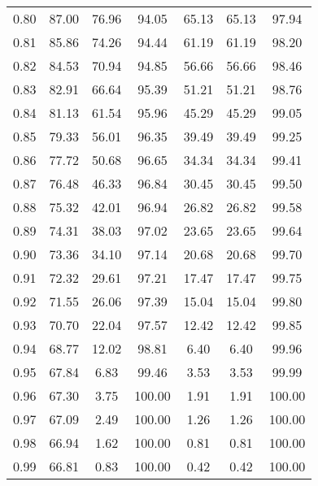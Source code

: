\begin{tabular}{|c|c|c|c|c|c|c|}
      0.80 &     87.00 &     76.96 &      94.05 &   65.13 &      65.13 &         97.94 \\
      0.81 &     85.86 &     74.26 &      94.44 &   61.19 &      61.19 &         98.20 \\
      0.82 &     84.53 &     70.94 &      94.85 &   56.66 &      56.66 &         98.46 \\
      0.83 &     82.91 &     66.64 &      95.39 &   51.21 &      51.21 &         98.76 \\
      0.84 &     81.13 &     61.54 &      95.96 &   45.29 &      45.29 &         99.05 \\
      0.85 &     79.33 &     56.01 &      96.35 &   39.49 &      39.49 &         99.25 \\
      0.86 &     77.72 &     50.68 &      96.65 &   34.34 &      34.34 &         99.41 \\
      0.87 &     76.48 &     46.33 &      96.84 &   30.45 &      30.45 &         99.50 \\
      0.88 &     75.32 &     42.01 &      96.94 &   26.82 &      26.82 &         99.58 \\
      0.89 &     74.31 &     38.03 &      97.02 &   23.65 &      23.65 &         99.64 \\
      0.90 &     73.36 &     34.10 &      97.14 &   20.68 &      20.68 &         99.70 \\
      0.91 &     72.32 &     29.61 &      97.21 &   17.47 &      17.47 &         99.75 \\
      0.92 &     71.55 &     26.06 &      97.39 &   15.04 &      15.04 &         99.80 \\
      0.93 &     70.70 &     22.04 &      97.57 &   12.42 &      12.42 &         99.85 \\
      0.94 &     68.77 &     12.02 &      98.81 &    6.40 &       6.40 &         99.96 \\
      0.95 &     67.84 &      6.83 &      99.46 &    3.53 &       3.53 &         99.99 \\
      0.96 &     67.30 &      3.75 &     100.00 &    1.91 &       1.91 &        100.00 \\
      0.97 &     67.09 &      2.49 &     100.00 &    1.26 &       1.26 &        100.00 \\
      0.98 &     66.94 &      1.62 &     100.00 &    0.81 &       0.81 &        100.00 \\
      0.99 &     66.81 &      0.83 &     100.00 &    0.42 &       0.42 &        100.00 \\
\bottomrule
\end{tabular}
